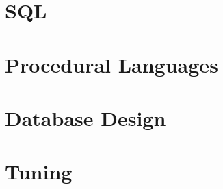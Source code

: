\documentclass[oneside]{book}
\begin{document}


\part{SQL}

\part{Procedural Languages}
\part{Database Design}
\part{Tuning}

\appendix

\listoffigures
\listoftables
\printindex{}
\end{document}
